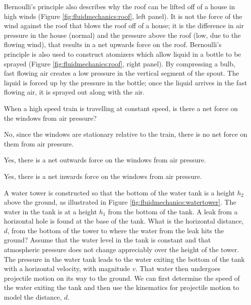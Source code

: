 {{Bernoulli's principle also describes why the roof can be lifted off of a house in high winds (Figure \ref{fig:fluidmechanics:roof}, left panel). It is not the force of the wind against the roof that blows the roof off of a house; it is the difference in air pressure in the house (normal) and the pressure above the roof (low, due to the flowing wind), that results in a net upwards force on the roof. Bernoulli's principle is also used to construct atomizers which allow liquid in a bottle to be sprayed (Figure \ref{fig:fluidmechanics:roof}, right panel). By compressing a bulb, fast flowing air creates a low pressure in the vertical segment of the spout. The liquid is forced up by the pressure in the bottle; once the liquid arrives in the fast flowing air, it is sprayed out along with the air.

\begin{checkpoint}
\begin{MCquestion}{When a high speed train is travelling at constant speed, is there a net force on the windows from air pressure?}
\item No, since the windows are stationary relative to the train, there is no net force on them from air pressure.
\item Yes, there is a net outwards force on the windows from air pressure. \correct
\item Yes, there is a net inwards force on the windows from air pressure.
\end{MCquestion}
\end{checkpoint}

\begin{example}{ A water tower is constructed so that the bottom of the water tank is a height $h_2$ above the ground, as illustrated in Figure \ref{fig:fluidmechanics:watertower}. The water in the tank is at a height $h_1$ from the bottom of the tank. A leak from a horizontal hole is found at the base of the tank. What is the horizontal distance, $d$, from the bottom of the tower to where the water from the leak hits the ground? Assume that the water level in the tank is constant and that atmospheric pressure does not change appreciably over the height of the tower.}
The pressure in the water tank leads to the water exiting the bottom of the tank with a horizontal velocity, with magnitude $v$. That water then undergoes projectile motion on its way to the ground. We can first determine the speed of the water exiting the tank and then use the kinematics for projectile motion to model the distance, $d$. 


\end{example}}}
